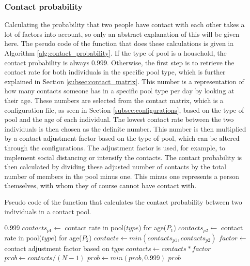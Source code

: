 \subsubsection{Contact probability}
Calculating the probability that two people have contact with each other takes a lot of factors into account, so only an abstract explanation of this will be given here. The pseudo code of the function that does these calculations is given in Algorithm \ref{alg:contact_probability}. If the type of pool is a household, the contact probability is always $0.999$. Otherwise, the first step is to retrieve the contact rate for both individuals in the specific pool type, which is further explained in Section \ref{subsec:contact_matrix}. This number is a representation of how many contacts someone has in a specific pool type per day by looking at their age. These numbers are selected from the contact matrix, which is a configuration file, as seen in Section \ref{subsec:configurations}, based on the type of pool and the age of each individual. The lowest contact rate between the two individuals is then chosen as the definite number. This number is then multiplied by a contact adjustment factor based on the type of pool, which can be altered through the configurations. The adjustment factor is used, for example, to implement social distancing or intensify the contacts. The contact probability is then calculated by dividing these adjusted number of contacts by the total number of members in the pool minus one. This minus one represents a person themselves, with whom they of course cannot have contact with.

\begin{algorithm}
\caption{Pseudo code of the function that calculates the contact probability between two individuals in a contact pool.}
\label{alg:contact_probability}
\begin{algorithmic}[1]
    \Statex
        \State \Return $0.999$
    \EndIf
    \Statex
    \State $contacts_{p1} \gets$ contact rate in pool($type$) for age($P_{1}$)
    \State $contacts_{p2} \gets$ contact rate in pool($type$) for age($P_{2}$)
    \State $contacts \gets min(contacts_{p1}, contacts_{p2})$
    \Statex
    \State  $factor \gets$ contact adjustment factor based on $type$
    \State $contacts \gets contacts * factor$
    \State $prob \gets contacts / (N-1)$
    \Statex
    \State $prob \gets min(prob, 0.999)$
    \State \Return $prob$
\end{algorithmic}
\end{algorithm}

